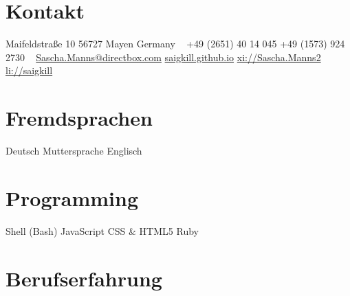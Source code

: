 \documentclass[a4paper,latin]{friggeri-cv} %
\begin{document}




\begin{aside} %
\section{Kontakt}
Maifeldstraße 10
56727 Mayen
Germany
~
+49 (2651) 40 14 045
+49 (1573) 924 2730
~
\href{mailto:Sascha.Manns@directbox.com}{Sascha.Manns@directbox.com}
\href{http://saigkill.github.io}{saigkill.github.io}
\href{https://www.xing.com/profile/Sascha_Manns2}{xi://Sascha.Manns2}
\href{http://de.linkedin.com/in/saigkill}{li://saigkill} 
\section{Fremdsprachen}
Deutsch Muttersprache
Englisch
\section{Programming}
{Shell (Bash)}
{JavaScript}
{CSS \& HTML5}
{Ruby}
\end{aside}


\section{Berufserfahrung}
\end{document}
